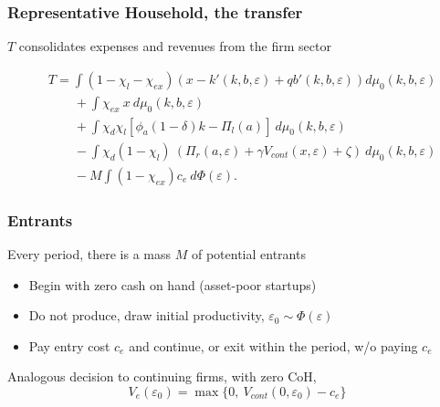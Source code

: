 \documentclass[aspectratio=169,xcolor=table]{beamer}
\begin{document}
\begin{frame}[label=HH_T] \frametitle{Representative Household, the transfer \hfill \hyperlink{Model Summary}{}}

$T$ consolidates expenses and revenues from the firm sector \vspace{-5mm} 

\begin{equation*} \label{eq:T}
    \begin{split}
        & T = \int (1 - \chi_l - \chi_{ex}) \left( x - k'(k,b,\varepsilon) + qb'(k,b,\varepsilon) \right) d \mu_0(k,b,\varepsilon) \\
        & \qquad + \int \chi_{ex} \ x \ d \mu_0(k,b,\varepsilon) \\
        & \qquad + \int \chi_d \chi_{l} [ \phi_a (1-\delta) k - \Pi_{l}(a)  ] \ d \mu_0(k,b,\varepsilon)  \\
        & \qquad  - \int \chi_d (1-\chi_{l}) \ (\Pi_r(a,\varepsilon) +  \gamma V_{cont} (x, \varepsilon) + \zeta) \ d \mu_0(k,b,\varepsilon) \\
        & \qquad - M \int (1-\chi_{ex}) c_e \ d \Phi(\varepsilon) .
    \end{split}
\end{equation*}

\end{frame}




\begin{frame}[label=Entrants] \frametitle{Entrants \hfill \hyperlink{Firmvalues}{} \hyperlink{distplot}{}}

Every period, there is a mass $M$ of potential entrants
\begin{itemize} \small
    \item Begin with zero cash on hand (asset-poor startups)  
    \item Do not produce, draw initial productivity, $\varepsilon_0 \sim \Phi(\varepsilon)$  
    \item Pay entry cost $c_e$ and continue, or exit within the period, w/o paying $c_e$
\end{itemize} \normalsize \vspace{5mm}

Analogous decision to continuing firms, with zero CoH,
\begin{equation*} \label{eq:entrant decision}
V_e(\varepsilon_0) = \max \{0, \ V_{cont}(0,\varepsilon_0) - c_e \}
\end{equation*}


\end{frame}
\end{document}
